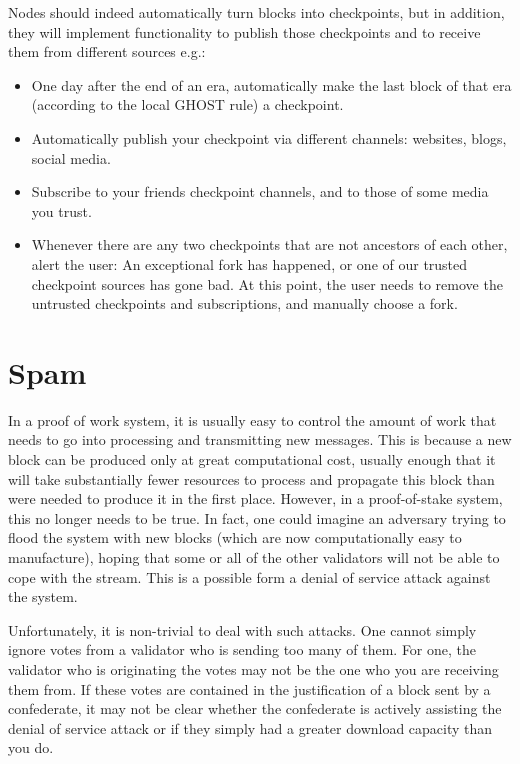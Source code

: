 \documentclass[12pt, fleqn]{article}
\begin{document}
Nodes should indeed automatically turn blocks into checkpoints, but in addition, they will implement functionality to publish those checkpoints and to receive them from different sources e.g.:
\begin{itemize}
  \item One day after the end of an era, automatically make the last block of that era (according to the local GHOST rule) a checkpoint.
  \item Automatically publish your checkpoint via different channels: websites, blogs, social media.
  \item Subscribe to your friends checkpoint channels, and to those of some media you trust.
  \item Whenever there are any two checkpoints that are not ancestors of each other, alert the user: An exceptional fork has happened, or one of our trusted checkpoint sources has gone bad. At this point, the user needs to remove the untrusted checkpoints and subscriptions, and manually choose a fork.
\end{itemize}

\section{Spam}

In a proof of work system, it is usually easy to control the amount of work that needs to go into processing and transmitting new messages. This is because a new block can be produced only at great computational cost, usually enough that it will take substantially fewer resources to process and propagate this block than were needed to produce it in the first place. However, in a proof-of-stake system, this no longer needs to be true. In fact, one could imagine an adversary trying to flood the system with new blocks (which are now computationally easy to manufacture), hoping that some or all of the other validators will not be able to cope with the stream. This is a possible form a denial of service attack against the system.

Unfortunately, it is non-trivial to deal with such attacks. One cannot simply ignore votes from a validator who is sending too many of them. For one, the validator who is originating the votes may not be the one who you are receiving them from. If these votes are contained in the justification of a block sent by a confederate, it may not be clear whether the confederate is actively assisting the denial of service attack or if they simply had a greater download capacity than you do.
\end{document}

